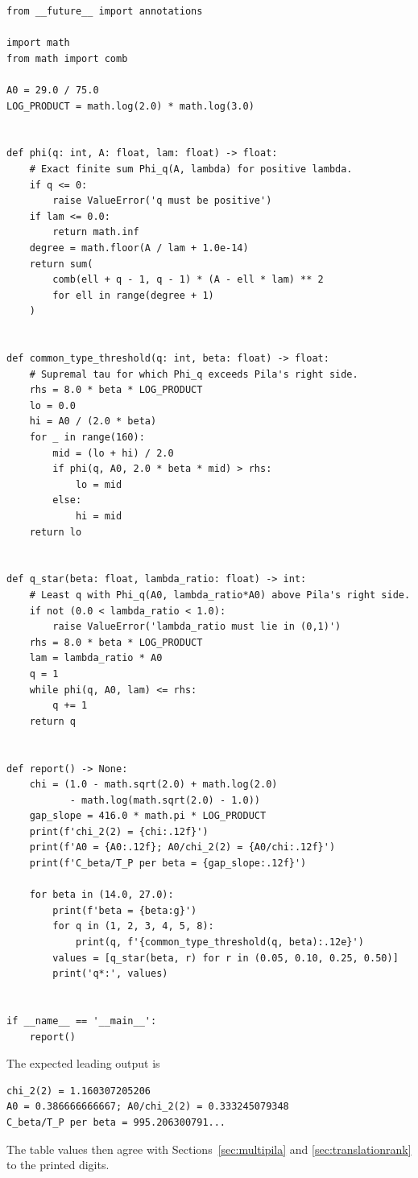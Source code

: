 \documentclass[11pt,oneside]{article}
\theoremstyle{definition}
\theoremstyle{remark}
\begin{document}
\begin{lstlisting}[style=pythonstyle,caption={Reproduction of the numerical constants}]
from __future__ import annotations

import math
from math import comb

A0 = 29.0 / 75.0
LOG_PRODUCT = math.log(2.0) * math.log(3.0)


def phi(q: int, A: float, lam: float) -> float:
    # Exact finite sum Phi_q(A, lambda) for positive lambda.
    if q <= 0:
        raise ValueError('q must be positive')
    if lam <= 0.0:
        return math.inf
    degree = math.floor(A / lam + 1.0e-14)
    return sum(
        comb(ell + q - 1, q - 1) * (A - ell * lam) ** 2
        for ell in range(degree + 1)
    )


def common_type_threshold(q: int, beta: float) -> float:
    # Supremal tau for which Phi_q exceeds Pila's right side.
    rhs = 8.0 * beta * LOG_PRODUCT
    lo = 0.0
    hi = A0 / (2.0 * beta)
    for _ in range(160):
        mid = (lo + hi) / 2.0
        if phi(q, A0, 2.0 * beta * mid) > rhs:
            lo = mid
        else:
            hi = mid
    return lo


def q_star(beta: float, lambda_ratio: float) -> int:
    # Least q with Phi_q(A0, lambda_ratio*A0) above Pila's right side.
    if not (0.0 < lambda_ratio < 1.0):
        raise ValueError('lambda_ratio must lie in (0,1)')
    rhs = 8.0 * beta * LOG_PRODUCT
    lam = lambda_ratio * A0
    q = 1
    while phi(q, A0, lam) <= rhs:
        q += 1
    return q


def report() -> None:
    chi = (1.0 - math.sqrt(2.0) + math.log(2.0)
           - math.log(math.sqrt(2.0) - 1.0))
    gap_slope = 416.0 * math.pi * LOG_PRODUCT
    print(f'chi_2(2) = {chi:.12f}')
    print(f'A0 = {A0:.12f}; A0/chi_2(2) = {A0/chi:.12f}')
    print(f'C_beta/T_P per beta = {gap_slope:.12f}')

    for beta in (14.0, 27.0):
        print(f'beta = {beta:g}')
        for q in (1, 2, 3, 4, 5, 8):
            print(q, f'{common_type_threshold(q, beta):.12e}')
        values = [q_star(beta, r) for r in (0.05, 0.10, 0.25, 0.50)]
        print('q*:', values)


if __name__ == '__main__':
    report()
\end{lstlisting}

The expected leading output is
\begin{verbatim}
chi_2(2) = 1.160307205206
A0 = 0.386666666667; A0/chi_2(2) = 0.333245079348
C_beta/T_P per beta = 995.206300791...
\end{verbatim}
The table values then agree with Sections~\ref{sec:multipila} and
\ref{sec:translationrank} to the printed digits.
\end{document}
